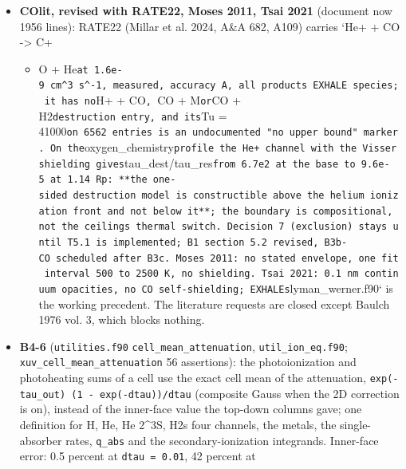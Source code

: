 \documentclass[english,a4paper]{my_memo}
\providecommand{\tightlist}{\setlength{\itemsep}{0pt}\setlength{\parskip}{0pt}}
\begin{document}
\begin{itemize}
  HD 209458 b\textquotesingle s orbital distance set to 0.04707 AU (Oklopcic and Hirata
  2018, the reference the run is compared with; the input said 0.0480 while
  the file was scaled to 0.04707); the setup report\textquotesingle s flux ratio format
  (\texttt{F8.3} overflowed when the sub-Lyman band dominates); the three
  benchmark directories added to the coverage script\textquotesingle s inventory (all pass).
  Known: \texttt{Load\ IC?\ True} in the two planet folders is broken by the grid
  guard (pre-rebaseline IC), the same class as the \texttt{hp\_*} regeneration.
\item
  \textbf{COlit, revised with RATE22, Moses 2011, Tsai 2021} (document now 1956
  lines): RATE22 (Millar et al. 2024, A\&A 682, A109) carries `He+ + CO -\textgreater{} C+

  \begin{itemize}
  \tightlist
  \item
    O + He\texttt{at\ 1.6e-9\ cm\^{}3\ s\^{}-1,\ measured,\ accuracy\ A,\ all\ products\ EXHALE\ species;\ it\ has\ no}H+ + CO\texttt{,\ }CO + M\texttt{or}CO + H2\texttt{destruction\ entry,\ and\ its}Tu = 41000\texttt{on\ 6562\ entries\ is\ an\ undocumented\ "no\ upper\ bound"\ marker.\ On\ the}oxygen\_chemistry\texttt{profile\ the\ He+\ channel\ with\ the\ Visser\ shielding\ gives}tau\_dest/tau\_res\texttt{from\ 6.7e2\ at\ the\ base\ to\ 9.6e-5\ at\ 1.14\ Rp:\ **the\ one-sided\ destruction\ model\ is\ constructible\ above\ the\ helium\ ionization\ front\ and\ not\ below\ it**;\ the\ boundary\ is\ compositional,\ not\ the\ ceiling\textquotesingle{}s\ thermal\ switch.\ Decision\ 7\ (exclusion)\ stays\ until\ T5.1\ is\ implemented;\ B1\ section\ 5.2\ revised,\ B3b-CO\ scheduled\ after\ B3c.\ Moses\ 2011:\ no\ stated\ envelope,\ one\ fit\ interval\ 500\ to\ 2500\ K,\ no\ shielding.\ Tsai\ 2021:\ 0.1\ nm\ continuum\ opacities,\ no\ CO\ self-shielding;\ EXHALE\textquotesingle{}s}lyman\_werner.f90` is the working precedent. The
    literature requests are closed except Baulch 1976 vol. 3, which blocks
    nothing.
  \end{itemize}
\item
  \textbf{B4-6} (\texttt{utilities.f90} \texttt{cell\_mean\_attenuation}, \texttt{util\_ion\_eq.f90};
  \texttt{xuv\_cell\_mean\_attenuation} 56 assertions): the photoionization and
  photoheating sums of a cell use the exact cell mean of the attenuation,
  \texttt{exp(-tau\_out)\ (1\ -\ exp(-dtau))/dtau} (composite Gauss when the 2D
  correction is on), instead of the inner-face value the top-down columns
  gave; one definition for H, He, He 2\^{}3S, H2\textquotesingle s four channels, the metals,
  the single-absorber rates, \texttt{q\_abs} and the secondary-ionization
  integrands. Inner-face error: 0.5 percent at \texttt{dtau\ =\ 0.01}, 42 percent at


\end{itemize}
\end{document}
